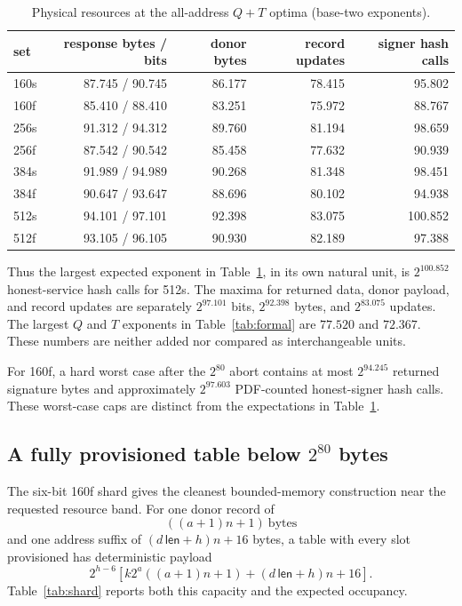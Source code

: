 \documentclass[11pt,a4paper]{article}
\begin{document}
\begin{table}[ht]
\centering
\small
\caption{Physical resources at the all-address $Q+T$ optima (base-two
exponents).}
\label{tab:physical}
\scriptsize
\begin{tabular}{lrrrr}
\toprule
set & response bytes / bits & donor bytes & record updates & signer hash calls\\
\midrule
160s &87.745 / 90.745&86.177&78.415&95.802\\
160f &85.410 / 88.410&83.251&75.972&88.767\\
256s &91.312 / 94.312&89.760&81.194&98.659\\
256f &87.542 / 90.542&85.458&77.632&90.939\\
384s &91.989 / 94.989&90.268&81.348&98.451\\
384f &90.647 / 93.647&88.696&80.102&94.938\\
512s &94.101 / 97.101&92.398&83.075&100.852\\
512f &93.105 / 96.105&90.930&82.189&97.388\\
\bottomrule
\end{tabular}
\end{table}

Thus the largest expected exponent in Table~\ref{tab:physical}, in its own
natural unit, is $2^{100.852}$ honest-service hash calls for 512s.  The maxima
for returned data, donor payload, and record updates are separately
$2^{97.101}$ bits, $2^{92.398}$ bytes, and $2^{83.075}$ updates.  The largest
$Q$ and $T$ exponents in Table~\ref{tab:formal} are $77.520$ and $72.367$.
These numbers are neither added nor compared as interchangeable units.

For 160f, a hard worst case after the $2^{80}$ abort contains at most
$2^{94.245}$ returned signature bytes and approximately $2^{97.603}$
PDF-counted honest-signer hash calls.  These worst-case caps are distinct from
the expectations in Table~\ref{tab:physical}.

\subsection{A fully provisioned table below
\texorpdfstring{$2^{80}$}{2-to-the-80} bytes}

The six-bit 160f shard gives the cleanest bounded-memory construction near the
requested resource band.  For one donor record of
\begin{equation}
                        ((a+1)n+1)\ \text{bytes}              \label{eq:record}
\end{equation}
and one address suffix of $(d\,\mathsf{len}+h)n+16$ bytes, a table with every
slot provisioned has deterministic payload
\begin{equation}
 2^{h-6}\left[k2^a((a+1)n+1)+(d\,\mathsf{len}+h)n+16\right]. \label{eq:hardmem}
\end{equation}
Table~\ref{tab:shard} reports both this capacity and the expected occupancy.
\end{document}
